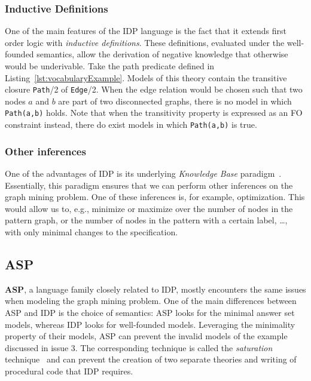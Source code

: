 \subsubsection{Inductive Definitions}
One of the main features of the IDP language is the fact that it extends first order logic with \emph{inductive definitions}. These definitions, evaluated under the well-founded semantics, allow the derivation of negative knowledge that otherwise would be underivable.
Take the path predicate defined in Listing~\ref{lst:vocabularyExample}.
Models of this theory contain the transitive closure \lstinline|Path|/2 of \lstinline|Edge|/2.
When the edge relation would be chosen such that two nodes $a$ and $b$ are part of two disconnected graphs, there is no model in which \lstinline|Path(a,b)| holds. Note that when the transitivity property is expressed as an FO constraint instead, there do exist models in which \lstinline|Path(a,b)| is true.


\subsubsection{Other inferences}
One of the advantages of IDP is its underlying \emph{Knowledge Base} paradigm~\citep{WarrenBook/DeCatBBD16}.
Essentially, this paradigm ensures that we can perform other inferences on the graph mining problem.
One of these inferences is, for example, optimization.
This would allow us to, e.g., minimize or maximize over the number of nodes in the pattern graph, or the number of nodes in the pattern with a certain label, \ldots, with only minimal changes to the specification.

\reversemarginpar

\subsection{ASP}
\textbf{ASP}, a language family closely related to IDP, mostly encounters the same issues when modeling the graph mining problem.
One of the main differences between ASP and IDP is the choice of semantics: ASP looks for the minimal answer set models, whereas IDP looks for well-founded models.
Leveraging the minimality property of their models, ASP can prevent the invalid models of the example discussed in issue 3.
The corresponding technique is called the \emph{saturation} technique~\citep{conf/rweb/EiterIK09} and can prevent the creation of two separate theories and writing of procedural code that IDP requires.

